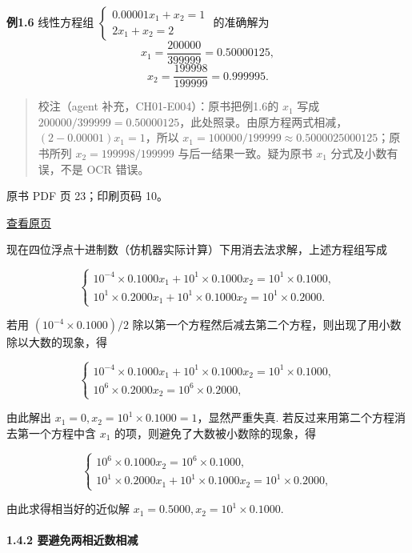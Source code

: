 \textbf{例1.6} 线性方程组 \(\begin{cases} 0.00001x_1 + x_2 = 1 \\ 2x_1 + x_2 = 2 \end{cases}\) 的准确解为 \[
x_1 = \frac{200000}{399999} = 0.50000125,
\] \[
x_2 = \frac{199998}{199999} = 0.999995.
\]

\begin{quote}
校注（agent 补充，CH01-E004）：原书把例1.6的 \(x_1\) 写成 \(200000/399999=0.50000125\)，此处照录。由原方程两式相减，\((2-0.00001)x_1=1\)，所以 \(x_1=100000/199999\approx0.5000025000125\)；原书所列 \(x_2=199998/199999\) 与后一结果一致。疑为原书 \(x_1\) 分式及小数有误，不是 OCR 错误。
\end{quote}

\clearpage

原书 PDF 页 23；印刷页码 10。

\href{source-images/pdf-023.jpeg}{查看原页}

现在四位浮点十进制数（仿机器实际计算）下用消去法求解，上述方程组写成

\[
\begin{cases} 10^{-4} \times 0.1000x_1 + 10^1 \times 0.1000x_2 = 10^1 \times 0.1000, \\ 10^1 \times 0.2000x_1 + 10^1 \times 0.1000x_2 = 10^1 \times 0.2000. \end{cases}
\]

若用 \((10^{-4} \times 0.1000)/2\) 除以第一个方程然后减去第二个方程，则出现了用小数除以大数的现象，得

\[
\begin{cases} 10^{-4} \times 0.1000x_1 + 10^1 \times 0.1000x_2 = 10^1 \times 0.1000, \\ 10^6 \times 0.2000x_2 = 10^6 \times 0.2000, \end{cases}
\]

由此解出 \(x_1=0, x_2=10^1 \times 0.1000=1\)，显然严重失真. 若反过来用第二个方程消去第一个方程中含 \(x_1\) 的项，则避免了大数被小数除的现象，得

\[
\begin{cases} 10^6 \times 0.1000x_2 = 10^6 \times 0.1000, \\ 10^1 \times 0.2000x_1 + 10^1 \times 0.1000x_2 = 10^1 \times 0.2000, \end{cases}
\]

由此求得相当好的近似解 \(x_1=0.5000, x_2=10^1 \times 0.1000\).

\paragraph{1.4.2 要避免两相近数相减}\label{ch01-ux8981ux907fux514dux4e24ux76f8ux8fd1ux6570ux76f8ux51cf}

